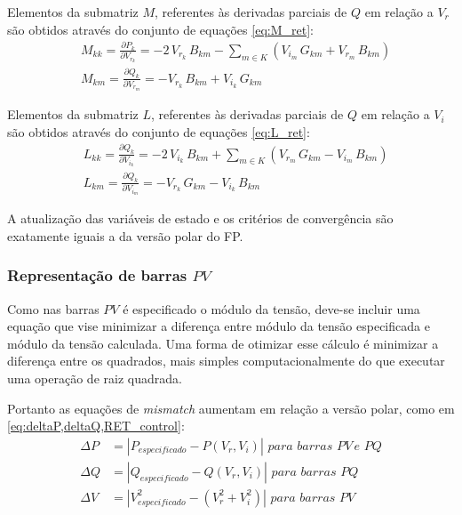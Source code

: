 Elementos da submatriz $M$, referentes às derivadas parciais de $Q$ em relação a $V_r$ são obtidos através do conjunto de equações \eqref{eq:M_ret}:
\begin{equation} \label{eq:M_ret}
    \begin{split}
        &M_{kk} = \frac{\partial P_k}{\partial V_{r_k}}=
-2\,V_{r_k}\,B_{km}-\sum_{m \in K} \left(V_{i_m}\,G_{km} + V_{r_m}\,B_{km} \right)\\
        &M_{km} =\frac{\partial Q_k}{\partial V_{r_m}}=
-V_{r_k}\,B_{km}+V_{i_k}\,G_{km}
    \end{split}
\end{equation}

Elementos da submatriz $L$, referentes às derivadas parciais de $Q$ em relação a $V_i$ são obtidos através do conjunto de equações \eqref{eq:L_ret}:
\begin{equation} \label{eq:L_ret}
    \begin{split}
        &L_{kk} = \frac{\partial Q_k}{\partial V_{i_k}}=
-2\,V_{i_k}\,B_{km}+\sum_{m \in K} \left(V_{r_m}\,G_{km} - V_{i_m}\,B_{km} \right)\\
        &L_{km} = \frac{\partial Q_k}{\partial V_{i_m}}=
-V_{r_k}\,G_{km}-V_{i_k}\,B_{km}
    \end{split}
\end{equation}

A atualização das variáveis de estado e os critérios de convergência são exatamente iguais a da versão polar do \ac{FP}.

\subsubsection{Representação de barras $PV$}

Como nas barras $PV$ é especificado o módulo da tensão, deve-se incluir uma equação que vise minimizar a diferença entre módulo da tensão especificada e módulo da tensão calculada. Uma forma de otimizar esse cálculo é minimizar a diferença entre os quadrados, mais simples computacionalmente do que executar uma operação de raiz quadrada.

Portanto as equações de \textit{mismatch} aumentam em relação a versão polar, como em \eqref{eq:deltaP,deltaQ,RET_control}:
\begin{equation}\label{eq:deltaP,deltaQ,RET_control}
    \begin{split}
            \Delta P &= |P_{especificado}-P(V_r, V_i)| \,\,para\,\,barras\,\,PV\,e \,\,PQ\\
            \Delta Q &= |Q_{especificado}-Q(V_r, V_i)|\,\, para\,\,barras\,\,PQ   \\
            \Delta V &= |V^2_{especificado}-(V_r^2+V_i^2)|\,\, para\,\,barras\,\,PV
             \end{split}
\end{equation}

